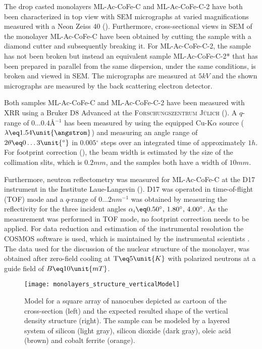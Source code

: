 \documentclass[\main/dresen_thesis.tex]{subfiles}
\begin{document}
    The drop casted monolayers ML-Ac-CoFe-C and ML-Ac-CoFe-C-2 have both been characterized in top view with SEM micrographs at varied magnifications measured with a Neon Zeiss 40 ().
    Furthermore, cross-sectional views in SEM of the monolayer ML-Ac-CoFe-C have been obtained by cutting the sample with a diamond cutter and subsequently breaking it.
    For ML-Ac-CoFe-C-2, the sample has not been broken but instead an equivalent sample ML-Ac-CoFe-C-2* that has been prepared in parallel from the same dispersion, under the same conditions, is broken and viewed in SEM.
    The micrographs are measured at $5 \unit{kV}$ and the shown micrographs are measured by the back scattering electron detector.

    Both samples ML-Ac-CoFe-C and ML-Ac-CoFe-C-2 have been measured with XRR using a Bruker D8 Advanced at the \textsc{Forschungszentrum J\"ulich} ().
    A $q$-range of $0 \ldots 0.4 \unit{\angstrom^{-1}}$ has been measured by using the equipped Cu-K$\alpha$ source ($\lambda \eq 1.54 \unit{\angstrom}$) and measuring an angle range of $2 \theta \eq 0 \ldots 3 \unit{^\circ}$ in $0.005 \unit{^\circ}$ steps over an integrated time of approximately $1 \unit{h}$.
    For footprint correction (), the beam width is estimated by the size of the collimation slits, which is $0.2 \unit{mm}$, and the samples both have a width of $10 \unit{mm}$.

    Furthermore, neutron reflectometry was measured for ML-Ac-CoFe-C at the D17 instrument in the Institute Laue-Langevin ().
    D17 was operated in time-of-flight (TOF) mode and a $q$-range of $0 \ldots 2 \unit{nm^{-1}}$ was obtained by measuring the reflectivity for the three incident angles $\alpha_i \eq 0.50^\circ ,\, 1.80^\circ ,\, 4.00^\circ$.
    As the measurement was performed in TOF mode, no footprint correction needs to be applied.
    For data reduction and estimation of the instrumental resolution the COSMOS software is used, which is maintained by the instrumental scientists \cite{Gutfreund_2018_Towar}.
    The data used for the discussion of the nuclear structure of the monolayer, was obtained after zero-field cooling at $\mathrm{T} \eq 5 \unit{K}$ with polarized neutrons at a guide field of $B \eq 10 \unit{mT}$.

    \begin{figure}[tb]
      \centering
      \texttt{[image: monolayers\_structure\_verticalModel]}
      \caption{\label{fig:monolayers:structure:verticalModel}Model for a square array of nanocubes depicted as cartoon of the cross-section (left) and the expected resulted shape of the vertical density structure (right). The sample can be modeled by a layered system of silicon (light gray), silicon dioxide (dark gray), oleic acid (brown) and cobalt ferrite (orange). }
    \end{figure}
\end{document}
